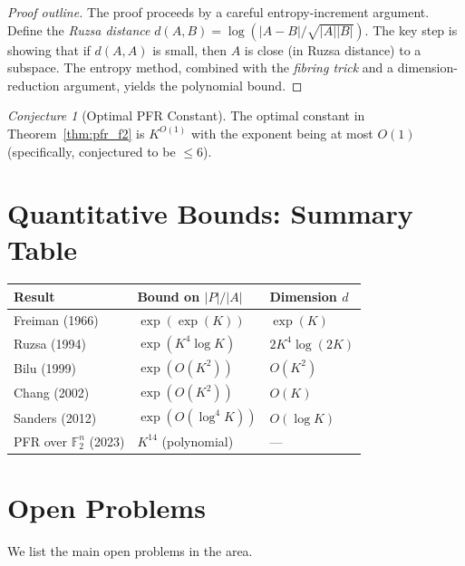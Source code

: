 \documentclass[12pt,a4paper]{amsart}
\theoremstyle{definition}
\theoremstyle{remark}
\newtheorem{conjecture}[theorem]{Conjecture}
\newcommand{\F}{\mathbb{F}}
\begin{document}
\begin{proof}[Proof outline]
The proof proceeds by a careful entropy-increment argument. Define the
\emph{Ruzsa distance} $d(A, B) = \log(|A-B| / \sqrt{|A||B|})$. The key step is
showing that if $d(A, A)$ is small, then $A$ is close (in Ruzsa distance) to a
subspace. The entropy method, combined with the \emph{fibring trick} and a
dimension-reduction argument, yields the polynomial bound.
\end{proof}

\begin{conjecture}[Optimal PFR Constant]\label{conj:pfr_optimal}
The optimal constant in Theorem~\ref{thm:pfr_f2} is $K^{O(1)}$ with the
exponent being at most $O(1)$ (specifically, conjectured to be $\leq 6$).
\end{conjecture}

\section{Quantitative Bounds: Summary Table}\label{sec:summary}

\begin{center}
\begin{tabular}{lll}
\toprule
\textbf{Result} & \textbf{Bound on $|P|/|A|$} & \textbf{Dimension $d$} \\
\midrule
Freiman (1966) & $\exp(\exp(K))$ & $\exp(K)$ \\
Ruzsa (1994)   & $\exp(K^4 \log K)$ & $2K^4 \log(2K)$ \\
Bilu (1999)    & $\exp(O(K^2))$ & $O(K^2)$ \\
Chang (2002)   & $\exp(O(K^2))$ & $O(K)$ \\
Sanders (2012) & $\exp(O(\log^4 K))$ & $O(\log K)$ \\
PFR over $\F_2^n$ (2023) & $K^{14}$ (polynomial) & --- \\
\bottomrule
\end{tabular}
\end{center}

\section{Open Problems}\label{sec:open}

We list the main open problems in the area.
\end{document}
